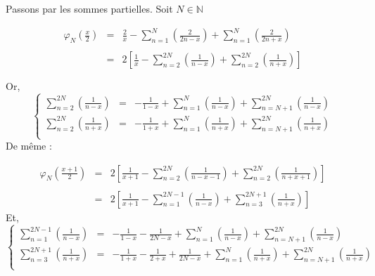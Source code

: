 Passons par les sommes partielles.
Soit $N\in\mathbb{N}$

\[
  \begin{array}{rcl}
    \varphi_N\left(\frac{x}{2}\right) & = & \frac{2}{x}
    -
    \sum\limits_{n=1}^{N} \left(\frac{2}{2n-x}\right)
    +
    \sum\limits_{n=1}^{N} \left(\frac{2}{2n+x}\right)
    \\\\
                                      & = & 2 \left[
      \frac{1}{x}
      -
      \sum\limits_{n=2}^{2N} \left(\frac{1}{n-x}\right)
      +
      \sum\limits_{n=2}^{2N} \left(\frac{1}{n+x}\right)
      \right]
    \\\\
  \end{array}
\]
Or,
\[
  \left\{
  \begin{array}{rcl}
    \sum\limits_{n=2}^{2N} \left(\frac{1}{n-x}\right) & = & -\frac{1}{1-x} + \sum\limits_{n=1}^{N} \left(\frac{1}{n-x}\right) + \sum\limits_{n=N+1}^{2N} \left(\frac{1}{n-x}\right) \\
    \sum\limits_{n=2}^{2N} \left(\frac{1}{n+x}\right) & = & -\frac{1}{1+x} + \sum\limits_{n=1}^{N} \left(\frac{1}{n+x}\right) + \sum\limits_{n=N+1}^{2N} \left(\frac{1}{n+x}\right) \\
  \end{array}
  \right.
\]
De même :

\[
  \begin{array}{rcl}
    \varphi_N\left(\frac{x+1}{2}\right) & = & 2 \left[
      \frac{1}{x+1}
      -
      \sum\limits_{n=2}^{2N} \left(\frac{1}{n-x-1}\right)
      +
      \sum\limits_{n=2}^{2N} \left(\frac{1}{n+x+1}\right)
      \right]
    \\\\
                                        & = & 2 \left[
      \frac{1}{x+1}
      -
      \sum\limits_{n=1}^{2N-1} \left(\frac{1}{n-x}\right)
      +
      \sum\limits_{n=3}^{2N+1} \left(\frac{1}{n+x}\right)
      \right]
  \end{array}
\]
Et,
\[
  \left\{
  \begin{array}{rcl}
    \sum\limits_{n=1}^{2N-1} \left(\frac{1}{n-x}\right) & = & -\frac{1}{1-x} - \frac{1}{2N-x} + \sum\limits_{n=1}^{N} \left(\frac{1}{n-x}\right) + \sum\limits_{n=N+1}^{2N} \left(\frac{1}{n-x}\right)                \\
    \sum\limits_{n=3}^{2N+1} \left(\frac{1}{n+x}\right) & = & -\frac{1}{1+x} -\frac{1}{2+x} + \frac{1}{2N-x} + \sum\limits_{n=1}^{N} \left(\frac{1}{n+x}\right) + \sum\limits_{n=N+1}^{2N} \left(\frac{1}{n+x}\right) \\
  \end{array}
  \right.
\]

